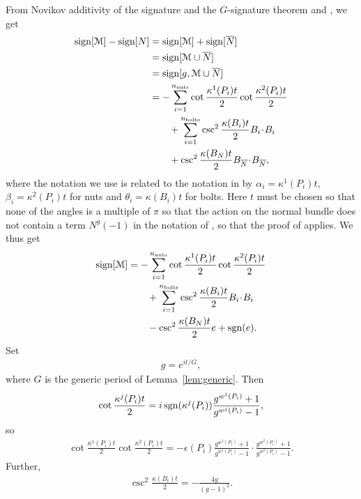 \documentclass[a4paper,10pt,reqno]{amsart}
\newcommand{\nut}{P}
\newcommand{\bolt}{B}
\newcommand{\sgn}{\mathop{\rm sgn}}
\newcommand{\sign}{\mathop{\rm sign}}
\newcommand{\cM}{\mathcal{M}}
\theoremstyle{plain}
\newcommand{\nnuts}{n_{\text{\rm nuts}}}
\newcommand{\nbolts}{n_{\text{\rm bolts}}}
\numberwithin{equation}{section}
\begin{document}
From Novikov additivity of the signature and the $G$-signature theorem \cite[Theorem~6.12]{AS-III}  and \cite[Proposition~6.18]{AS-III}, 
we get
\begin{align}
\sign[\cM] - \sign[N] 
&=\sign[\cM] + \sign[\overline{N}] \nonumber \\
&= \sign[\cM \cup \overline{N}] \nonumber \\
&= \sign[g,\cM \cup \overline{N}] \nonumber \\
&= - \sum_{i=1}^{\nnuts} \cot\frac{\kappa^1(\nut_i) t}{2}\cot\frac{\kappa^2(\nut_i) t}{2} \nonumber \\
&\qquad
+ \sum_{i=1}^{\nbolts} \csc^2 \frac{\kappa(\bolt_i) t}{2} B_i \! \cdot \! B_i \nonumber \\
&\qquad
+ \csc^2 \frac{\kappa(\bolt_N) t}{2} B_{\overline{N}} \!\cdot\! B_{\overline{N}},
\end{align}
where the notation we use is related to the notation in \cite[Proposition~6.18]{AS-III} by $\alpha_i = \kappa^1(\nut_i) t$, $\beta_i = \kappa^2(\nut_i) t$ for nuts and $\theta_i = \kappa(\bolt_i) t$ for bolts. Here $t$ must be chosen so that none of the angles is a  multiple of $\pi$ so that the action on the normal bundle does not contain a term $N^g(-1)$ in the notation of \cite{AS-III}, so that the proof of \cite[Proposition 6.18]{AS-III} applies. 
We thus get
\begin{align}
\sign[\cM] 
&= - \sum_{i=1}^{\nnuts} \cot\frac{\kappa^1(\nut_i) t}{2}\cot\frac{\kappa^2(\nut_i) t}{2} \nonumber \\
&\qquad
+ \sum_{i=1}^{\nbolts} \csc^2 \frac{\kappa(\bolt_i) t}{2} B_i \!\cdot\! B_i \nonumber \\
&\qquad
- \csc^2 \frac{\kappa(\bolt_N) t}{2} e  +\sgn(e).
\end{align}
Set 
\begin{align}\label{eq:g-def-G} 
g = e^{it/G}, 
\end{align} 
where $G$ is the generic period of Lemma~\ref{lem:generic}. Then
\begin{align}
\cot\frac{\kappa^j(\nut_i) t}{2} 
= i \sgn(\kappa^j(\nut_i)) \frac{g^{w^j(\nut_i)} + 1}{g^{w^j(\nut_i)} - 1},
\end{align}
so 
\begin{align}
\cot\frac{\kappa^1(\nut_i) t}{2} 
\cot\frac{\kappa^2(\nut_i) t}{2} 
= - \epsilon(\nut_i) 
\frac{g^{w^1(\nut_i)} + 1}{g^{w^1(\nut_i)} - 1} \cdot 
\frac{g^{w^2(\nut_i)} + 1}{g^{w^2(\nut_i)} - 1}.
\end{align}
Further, 
\begin{align}
\csc^2 \frac{\kappa(\bolt_i) t}{2} 
= -\frac{4g}{(g-1)^2}.
\end{align}
\end{document}
